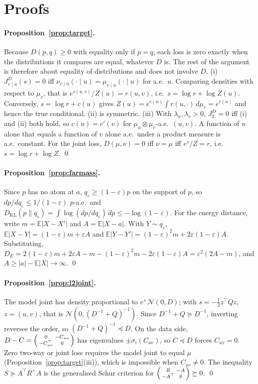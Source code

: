 \documentclass[11pt]{article}
\newcommand{\KL}{D_{\mathrm{KL}}}
\newcommand{\E}{\mathbb{E}}
\newcommand{\vu}{{v\mid u}}
\theoremstyle{plain}
\theoremstyle{definition}
\theoremstyle{remark}
\begin{document}
\section{Proofs}

\paragraph{Proposition~\ref{prop:target}.} Because $D(p,q)\ge0$ with equality only if $p=q$, each
loss is zero exactly when the distributions it compares are equal, whatever $D$ is. The
rest of the argument is therefore about equality of distributions and does not involve
$D$. (i) $J^D_\vu(s)=0$ iff $\nu_\vu(\cdot\mid u)=\mu_\vu(\cdot\mid u)$ for
a.e.\ $u$. Comparing densities with respect to $\mu_v$, that is $e^{s(u,v)}/Z(u)=r(u,v)$, i.e.\
$s=\log r+\log Z(u)$. Conversely, $s=\log r+c(u)$ gives $Z(u)=e^{c(u)}\int r(u,\cdot)\,d\mu_v=e^{c(u)}$ and
hence the true conditional. (ii) is symmetric. (iii) With $\lambda_u,\lambda_v>0$, $J^D_2=0$ iff (i) and
(ii) both hold, so $c(u)=c'(v)$ for $\mu_u\otimes\mu_v$-a.e.\ $(u,v)$. A function of $u$ alone that
equals a function of $v$ alone a.e.\ under a product measure is a.e.\ constant. For the joint
loss, $D(\mu,\nu)=0$ iff $\nu=\mu$ iff $e^{s}/Z=r$, i.e.\ $s=\log r+\log Z$. \qed

\paragraph{Proposition~\ref{prop:farmass}.} Since $p$ has no atom at $a$, $q_\varepsilon\ge(1-\varepsilon)p$ on
the support of $p$, so $dp/dq_\varepsilon\le1/(1-\varepsilon)$ $p$-a.e.\ and
$\KL(p\|q_\varepsilon)=\int\log(dp/dq_\varepsilon)\,dp\le-\log(1-\varepsilon)$. For the energy distance, write
$m=\E|X-X'|$ and $A=\E|X-a|$. With $Y\sim q_\varepsilon$, $\E|X-Y|=(1-\varepsilon)m+\varepsilon A$ and
$\E|Y-Y'|=(1-\varepsilon)^2m+2\varepsilon(1-\varepsilon)A$. Substituting,
$D_E=2(1-\varepsilon)m+2\varepsilon A-m-(1-\varepsilon)^2m-2\varepsilon(1-\varepsilon)A=\varepsilon^2(2A-m)$, and
$A\ge|a|-\E|X|\to\infty$. \qed

\paragraph{Proposition~\ref{prop:l2joint}.} The model joint has density proportional to
$e^{s}\,\mathcal N(0,D)$; with $s=-\frac12z^\top Qz$, $z=(u,v)$, that is
$\mathcal N(0,(D^{-1}+Q)^{-1})$. Since $D^{-1}+Q\succeq D^{-1}$, inverting reverses the order, so
$(D^{-1}+Q)^{-1}\preceq D$. On the data side,
$D-C=\begin{psmallmatrix}0&-C_{uv}\\-C_{uv}^\top&0\end{psmallmatrix}$ has eigenvalues
$\pm\sigma_i(C_{uv})$, so $C\preceq D$ forces $C_{uv}=0$. Zero two-way or joint loss requires the
model joint to equal $\mu$ (Proposition~\ref{prop:target}(iii)), which is impossible when
$C_{uv}\ne0$. The inequality $S\succeq A^\top R^+A$ is the generalised Schur criterion for
$\begin{psmallmatrix}R&-A\\-A^\top&S\end{psmallmatrix}\succeq0$. \qed
\end{document}
